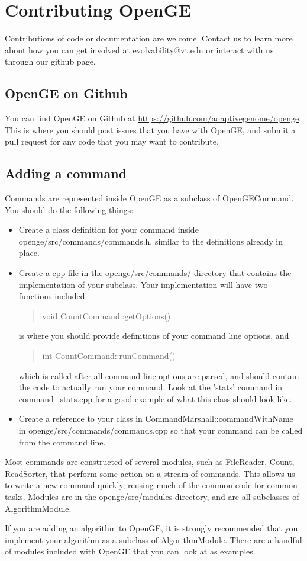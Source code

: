 \documentclass[11pt]{article}
\newcommand {\cmd}[1] {\begin{quote}#1\end{quote}}
\begin{document}
\section {Contributing OpenGE}
Contributions of code or documentation are welcome. Contact us to learn more about how you can get involved at evolvability@vt.edu or interact with us through our github page.

\subsection {OpenGE on Github}
You can find OpenGE on Github at \url{https://github.com/adaptivegenome/openge}. This is where you should post issues that you have with OpenGE, and submit a pull request for any code that you may want to contribute.
\subsection {Adding a command}
Commands are represented inside OpenGE as a subclass of OpenGECommand. You should do the following things:
\begin{itemize}
\item Create a class definition for your command inside openge/src/commands/commands.h, similar to the definitions already in place.
\item Create a cpp file in the openge/src/commands/ directory that contains the implementation of your subclass. Your implementation will have two functions included- 
\cmd {void CountCommand::getOptions()}
is where you should provide definitions of your command line options, and 
\cmd{int CountCommand::runCommand()}
which is called after all command line options are parsed, and should contain the code to actually run your command. Look at the 'stats' command in command\_stats.cpp for a good example of what this class should look like.
\item Create a reference to your class in CommandMarshall::commandWithName in openge/src/commands/commands.cpp so that your command can be called from the command line.
\end{itemize}

Most commands are constructed of several modules, such as FileReader, Count, ReadSorter, that perform some action on a stream of commands. This allows us to write a new command quickly, reusing much of the common code for common tasks. Modules are in the openge/src/modules directory, and are all subclasses of AlgorithmModule.

If you are adding an algorithm to OpenGE, it is strongly recommended that you implement your algorithm as a subclass of AlgorithmModule. There are a handful of modules included with OpenGE that you can look at as examples.
\end{document}

